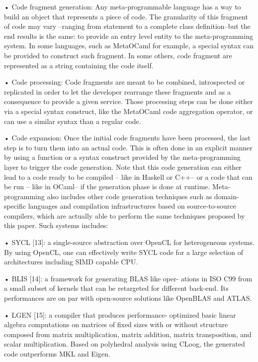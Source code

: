 \documentclass[../../main.tex]{subfiles}
\begin{document}
• Code fragment generation: Any meta-programmable
language has a way to build an object that represents a
piece of code. The granularity of this fragment of code
may vary –ranging from statement to a complete class
definition–but the end results is the same: to provide
an entry level entity to the meta-programming system.
In some languages, such as MetaOCaml for example,
a special syntax can be provided to construct such
fragment. In some others, code fragment are represented
as a string containing the code itself.

• Code processing: Code fragments are meant to
be combined, introspected or replicated in order to
let the developer rearrange these fragments and as a
consequence to provide a given service. Those processing
steps can be done either via a special syntax construct,
like the MetaOCaml code aggregation operator, or can
use a similar syntax than a regular code.

• Code expansion: Once the initial code fragments have
been processed, the last step is to turn them into an
actual code. This is often done in an explicit manner by
using a function or a syntax construct provided by the
meta-programming layer to trigger the code generation.
Note that this code generation can either lead to a code
ready to be compiled – like in Haskell or C++– or a
code that can be run – like in OCaml– if the generation
phase is done at runtime.
Meta-programming also includes other code generation
techniques such as domain-specific languages and compilation
infrastructures based on source-to-source compilers, which
are actually able to perform the same techniques proposed by
this paper. Such systems includes:

• SYCL [13]: a single-source abstraction over OpenCL
for heterogeneous systems. By using OpenCL, one can
effectively write SYCL code for a large selection of
architectures including SIMD capable CPU.

• BLIS [14]: a framework for generating BLAS like oper-
ations in ISO C99 from a small subset of kernels that can
be retargeted for different back-end. Its performances are
on par with open-source solutions like OpenBLAS and
ATLAS.

• LGEN [15]: a compiler that produces performance-
optimized basic linear algebra computations on matrices
of fixed sizes with or without structure composed
from matrix multiplication, matrix addition, matrix
transposition, and scalar multiplication. Based on
polyhedral analysis using CLoog, the generated code
outperforms MKL and Eigen.
\end{document}
